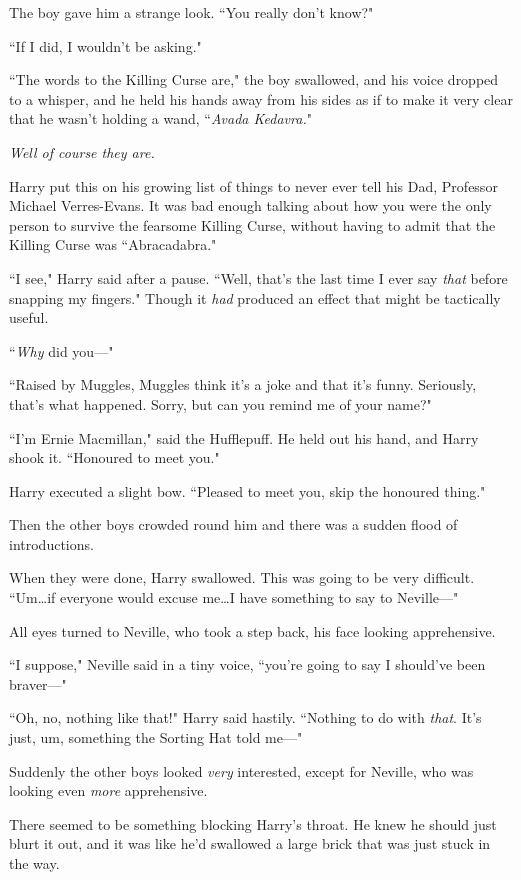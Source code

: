 The boy gave him a strange look. ``You really don't know?"

``If I did, I wouldn't be asking."

``The words to the Killing Curse are," the boy swallowed, and his voice dropped to a whisper, and he held his hands away from his sides as if to make it very clear that he wasn't holding a wand, ``\emph{Avada Kedavra.}"

\emph{Well of course they are.}

Harry put this on his growing list of things to never ever tell his Dad, Professor Michael Verres-Evans. It was bad enough talking about how you were the only person to survive the fearsome Killing Curse, without having to admit that the Killing Curse was ``Abracadabra."

``I see," Harry said after a pause. ``Well, that's the last time I ever say \emph{that} before snapping my fingers." Though it \emph{had} produced an effect that might be tactically useful.

``\emph{Why} did you—"

``Raised by Muggles, Muggles think it's a joke and that it's funny. Seriously, that's what happened. Sorry, but can you remind me of your name?"

``I'm Ernie Macmillan," said the Hufflepuff. He held out his hand, and Harry shook it. ``Honoured to meet you."

Harry executed a slight bow. ``Pleased to meet you, skip the honoured thing."

Then the other boys crowded round him and there was a sudden flood of introductions.

When they were done, Harry swallowed. This was going to be very difficult. ``Um…if everyone would excuse me…I have something to say to Neville—"

All eyes turned to Neville, who took a step back, his face looking apprehensive.

``I suppose," Neville said in a tiny voice, ``you're going to say I should've been braver—"

``Oh, no, nothing like that!" Harry said hastily. ``Nothing to do with \emph{that}. It's just, um, something the Sorting Hat told me—"

Suddenly the other boys looked \emph{very} interested, except for Neville, who was looking even \emph{more} apprehensive.

There seemed to be something blocking Harry's throat. He knew he should just blurt it out, and it was like he'd swallowed a large brick that was just stuck in the way.

